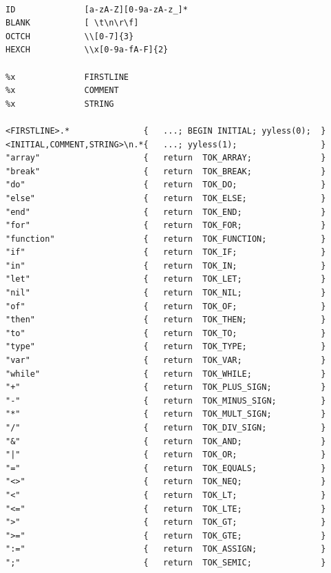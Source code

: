 \begin{verbatim}

ID              [a-zA-Z][0-9a-zA-z_]*
BLANK           [ \t\n\r\f]
OCTCH           \\[0-7]{3}
HEXCH           \\x[0-9a-fA-F]{2}

%x              FIRSTLINE
%x              COMMENT
%x              STRING

<FIRSTLINE>.*               {   ...; BEGIN INITIAL; yyless(0);  }
<INITIAL,COMMENT,STRING>\n.*{   ...; yyless(1);                 }
"array"                     {   return  TOK_ARRAY;              }
"break"                     {   return  TOK_BREAK;              }
"do"                        {   return  TOK_DO;                 }
"else"                      {   return  TOK_ELSE;               }
"end"                       {   return  TOK_END;                }
"for"                       {   return  TOK_FOR;                }
"function"                  {   return  TOK_FUNCTION;           }
"if"                        {   return  TOK_IF;                 }
"in"                        {   return  TOK_IN;                 }
"let"                       {   return  TOK_LET;                }
"nil"                       {   return  TOK_NIL;                }
"of"                        {   return  TOK_OF;                 }
"then"                      {   return  TOK_THEN;               }
"to"                        {   return  TOK_TO;                 }
"type"                      {   return  TOK_TYPE;               }
"var"                       {   return  TOK_VAR;                }
"while"                     {   return  TOK_WHILE;              }
"+"                         {   return  TOK_PLUS_SIGN;          }
"-"                         {   return  TOK_MINUS_SIGN;         }
"*"                         {   return  TOK_MULT_SIGN;          }
"/"                         {   return  TOK_DIV_SIGN;           }
"&"                         {   return  TOK_AND;                }
"|"                         {   return  TOK_OR;                 }
"="                         {   return  TOK_EQUALS;             }
"<>"                        {   return  TOK_NEQ;                }
"<"                         {   return  TOK_LT;                 }
"<="                        {   return  TOK_LTE;                }
">"                         {   return  TOK_GT;                 }
">="                        {   return  TOK_GTE;                }
":="                        {   return  TOK_ASSIGN;             }
";"                         {   return  TOK_SEMIC;              }

\end{verbatim}
